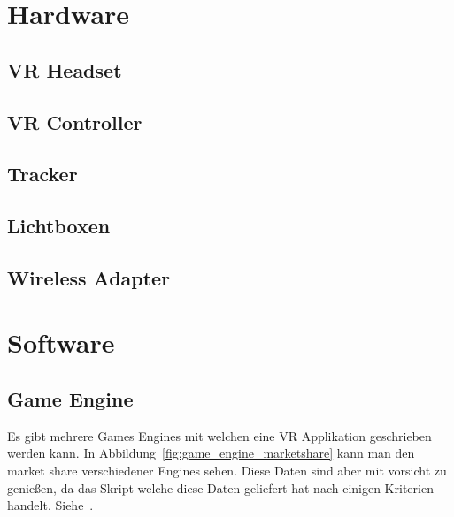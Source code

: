\section{Hardware}

\subsection{VR Headset}

\subsection{VR Controller}

\subsection{Tracker}

\subsection{Lichtboxen}\label{sec:lighthouse}

\subsection{Wireless Adapter }

\section{Software}

\subsection{Game Engine}

Es gibt mehrere Games Engines mit welchen eine VR Applikation geschrieben werden kann.
In Abbildung~\ref{fig:game_engine_marketshare} kann man den market share verschiedener Engines sehen.
Diese Daten sind aber mit vorsicht zu genießen, da das Skript welche diese Daten geliefert hat nach einigen Kriterien handelt.
Siehe~\cite{REDDIT_2018}.


